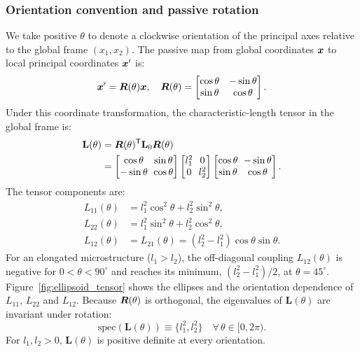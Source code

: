 \subsubsection{Orientation convention and passive rotation}
We take positive $\theta$ to denote a clockwise orientation of the principal axes relative to the global frame $(x_1,x_2)$. The passive map from global coordinates $\bm{x}$ to local principal coordinates $\bm{x}'$ is:
\begin{equation}
\bm{x}' = \bm{R}(\theta)\bm{x}, \quad \bm{R}(\theta) = \begin{bmatrix} \cos\theta & -\sin\theta \\ \sin\theta & \cos\theta \end{bmatrix}.
\label{eq:R_matrix}
\end{equation}
Under this coordinate transformation, the characteristic-length tensor in the global frame is:
\begin{equation}
\setlength{\arraycolsep}{3pt}
\begin{split}
\mathbf{L}(\theta) &= \bmR(\theta)^\mathsf{T} \mathbf{L}_0 \bmR(\theta) \\
&= \begin{bmatrix} \cos\theta & \sin\theta \\ -\sin\theta & \cos\theta \end{bmatrix} \begin{bmatrix} l_1^2 & 0 \\ 0 & l_2^2 \end{bmatrix} \begin{bmatrix} \cos\theta & -\sin\theta \\ \sin\theta & \cos\theta \end{bmatrix}.
\end{split}
\label{eq:L_rotation}
\end{equation}
The tensor components are:
\begin{subequations}
\label{eq:L_components}
\begin{align}
L_{11}(\theta) &= l_1^2 \cos^2\theta + l_2^2 \sin^2\theta, \label{eq:L11} \\
L_{22}(\theta) &= l_1^2 \sin^2\theta + l_2^2 \cos^2\theta, \label{eq:L22} \\
L_{12}(\theta) &= L_{21}(\theta) = (l_2^2 - l_1^2)\cos\theta\sin\theta. \label{eq:L12}
\end{align}
\end{subequations}
For an elongated microstructure ($l_1 > l_2$), the off-diagonal coupling $L_{12}(\theta)$ is negative for $0 < \theta < 90^\circ$ and reaches its minimum, $(l_2^2-l_1^2)/2$, at $\theta=45^\circ$. Figure~\ref{fig:ellipsoid_tensor} shows the ellipses and the orientation dependence of $L_{11}$, $L_{22}$ and $L_{12}$. Because $\bm{R}(\theta)$ is orthogonal, the eigenvalues of $\mathbf{L}(\theta)$ are invariant under rotation:
\begin{equation}
\mathrm{spec}(\mathbf{L}(\theta)) \equiv \{l_1^2, l_2^2\} \quad \forall\,\theta \in [0, 2\pi).
\label{eq:eigenvalues_invariant}
\end{equation}
For $l_1,l_2>0$, $\mathbf{L}(\theta)$ is positive definite at every orientation.

